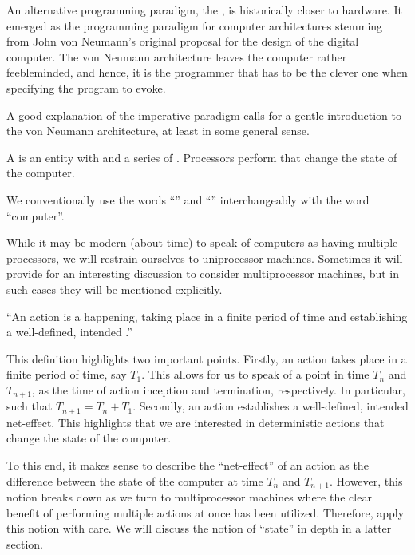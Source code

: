 An alternative programming paradigm, the , is historically
closer to hardware. It emerged as the programming paradigm for computer
architectures stemming from John von Neumann's original proposal for the design
of the digital computer\cite{von-neumann}.  The von Neumann architecture leaves
the computer rather feebleminded, and hence, it is the programmer that has to
be the clever one when specifying the program to evoke.

A good explanation of the imperative paradigm calls for a gentle introduction
to the von Neumann architecture, at least in some general sense.

\begin{definition}

A  is an entity with  and a series of
.  Processors perform  that change the state of
the computer.

\end{definition}

We conventionally use the words ``'' and ``''
interchangeably with the word ``computer''.

While it may be modern (about time) to speak of computers as having multiple
processors, we will restrain ourselves to uniprocessor machines. Sometimes it
will provide for an interesting discussion to consider multiprocessor machines,
but in such cases they will be mentioned explicitly.

\begin{definition}

``An action is a happening, taking place in a finite period of time and
establishing a well-defined, intended .''
\cite{dijkstra-introduction}

\end{definition}

This definition highlights two important points. Firstly, an action takes place
in a finite period of time, say $T_1$. This allows for us to speak of a point
in time $T_n$ and $T_{n+1}$, as the time of action inception and termination,
respectively. In particular, such that $T_{n+1}=T_n+T_1$. Secondly, an action
establishes a well-defined, intended net-effect. This highlights that we are
interested in deterministic actions that change the state of the computer.

To this end, it makes sense to describe the ``net-effect'' of an action as the
difference between the state of the computer at time $T_n$ and $T_{n+1}$.
However, this notion breaks down as we turn to multiprocessor machines where
the clear benefit of performing multiple actions at once has been utilized.
Therefore, apply this notion with care. We will discuss the notion of ``state''
in depth in a latter section.

